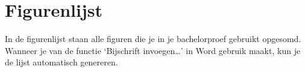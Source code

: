 \chapter{Figurenlijst}
In de figurenlijst staan alle figuren die je in je bachelorproef gebruikt
opgesomd. Wanneer je van de functie ‘Bijschrift invoegen…’ in Word gebruik 
maakt, kun je de lijst automatisch genereren.

